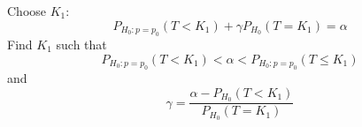 \documentclass[12 pt]{article}
\begin{document}
\begin{enumerate}[Step 1:]
      Choose $K_1$:
      $$P_{H_0:p=p_0}(T<K_1) + \gamma P_{H_0}(T=K_1) = \alpha$$
      Find $K_1$ such that
      $$P_{H_0:p=p_0} (T<K_1) < \alpha < P_{H_0: p = p_0} (T \leq
      K_1)$$
      and $$\gamma = \frac{\alpha - P_{H_0}(T<K_1)}{P_{H_0}(T=K_1)}$$
  \end{enumerate}
\end{document}
